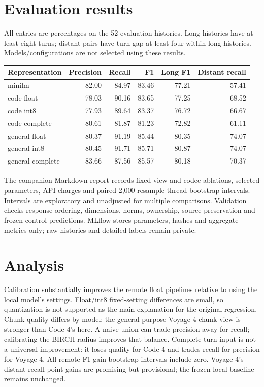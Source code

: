\documentclass[11pt]{article}
\begin{document}
\section{Evaluation results}
All entries are percentages on the 52 evaluation histories. Long histories
have at least eight turns; distant pairs have turn gap at least four within
long histories. Models/configurations are not selected using these results.
\begin{center}\small
\begin{tabular}{lrrrrr}
\toprule
Representation & Precision & Recall & F1 & Long F1 & Distant recall\\
\midrule
minilm & 82.00 & 84.97 & 83.46 & 77.21 & 57.41 \\
code float & 78.03 & 90.16 & 83.65 & 77.25 & 68.52 \\
code int8 & 77.93 & 89.64 & 83.37 & 76.72 & 66.67 \\
code complete & 80.61 & 81.87 & 81.23 & 72.82 & 61.11 \\
general float & 80.37 & 91.19 & 85.44 & 80.35 & 74.07 \\
general int8 & 80.45 & 91.71 & 85.71 & 80.87 & 74.07 \\
general complete & 83.66 & 87.56 & 85.57 & 80.18 & 70.37 \\
\bottomrule
\end{tabular}
\end{center}
The companion Markdown report records fixed-view and codec ablations, selected
parameters, API charges and paired 2,000-resample thread-bootstrap intervals.
Intervals are exploratory and unadjusted for multiple comparisons. Validation
checks response ordering, dimensions, norms, ownership, source preservation and
frozen-control predictions. MLflow stores parameters, hashes and aggregate
metrics only; raw histories and detailed labels remain private.

\section{Analysis}
Calibration substantially improves the remote float pipelines relative to
using the local model's settings. Float/int8 fixed-setting differences are
small, so quantization is not supported as the main explanation for the
original regression. Chunk quality differs by model: the general-purpose
Voyage 4 chunk view is stronger than Code 4's here. A naive union can trade
precision away for recall; calibrating the BIRCH radius improves that balance.
Complete-turn input is not a universal improvement: it loses quality for
Code 4 and trades recall for precision for Voyage 4. All remote F1-gain
bootstrap intervals include zero. Voyage 4's distant-recall point gains are
promising but provisional; the frozen local baseline remains unchanged.
\end{document}
